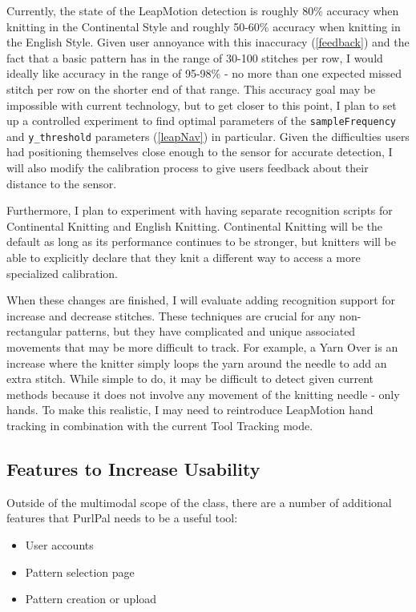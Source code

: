 \documentclass[11pt,twocolumn]{article}
\begin{document}
Currently, the state of the LeapMotion detection is roughly 80\% accuracy when knitting in the Continental Style and roughly 50-60\% accuracy when knitting in the English Style.
Given user annoyance with this inaccuracy (\ref{feedback}) and the fact that a basic pattern has in the range of 30-100 stitches per row, I would ideally like accuracy in the range of 95-98\% - no more than one expected missed stitch per row on the shorter end of that range.
This accuracy goal may be impossible with current technology, but to get closer to this point, I plan to set up a controlled experiment to find optimal parameters of the \texttt{sampleFrequency} and \texttt{y\_threshold} parameters (\ref{leapNav}) in particular.
Given the difficulties users had positioning themselves close enough to the sensor for accurate detection, I will also modify the calibration process to give users feedback about their distance to the sensor.


Furthermore, I plan to experiment with having separate recognition scripts for Continental Knitting and English Knitting.
Continental Knitting will be the default as long as its performance continues to be stronger, but knitters will be able to explicitly declare that they knit a different way to access a more specialized
 calibration.

When these changes are finished, I will evaluate adding recognition support for increase and decrease stitches.
These techniques are crucial for any non-rectangular patterns, but they have complicated and unique associated movements that may be more difficult to track.
For example, a Yarn Over is an increase where the knitter simply loops the yarn around the needle to add an extra stitch.
While simple to do, it may be difficult to detect given current methods because it does not involve any movement of the knitting needle - only hands.
To make this realistic, I may need to reintroduce LeapMotion hand tracking in combination with the current Tool Tracking mode.

\subsection{Features to Increase Usability} \label{future-use}

Outside of the multimodal scope of the class, there are a number of additional features that PurlPal needs to be a useful tool:

\begin{itemize}
  \item User accounts
  \item Pattern selection page
  \item Pattern creation or upload
\end{itemize}
\end{document}
